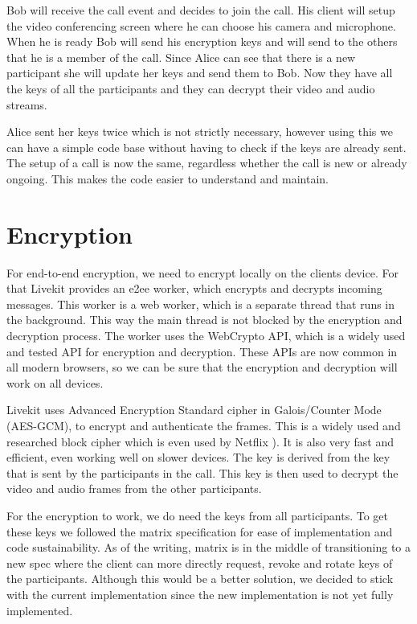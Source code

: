 \documentclass{report}
\begin{document}
Bob will receive the call event and decides to join the call. His client will setup the video conferencing
screen where he can choose his camera and microphone. When he is ready Bob will send his encryption keys and will
send to the others that he is a member of the call. Since Alice can see that there is a new participant she will
update her keys and send them to Bob. Now they have all the keys of all the participants and they can decrypt their
video and audio streams.

Alice sent her keys twice which is not strictly necessary, however using this we can have a simple code base
without having to check if the keys are already sent. The setup of a call is now the same, regardless whether
the call is new or already ongoing. This makes the code easier to understand and maintain.

\section{Encryption}
For end-to-end encryption, we need to encrypt locally on the clients device. For that Livekit provides an e2ee worker,
which encrypts and decrypts incoming messages. This worker is a web worker, which is a separate
thread that runs in the background. This way the main thread is not blocked by the encryption and decryption
process. The worker uses the WebCrypto API, which is a widely used and tested API for encryption and decryption.
These APIs are now common in all modern browsers, so we can be sure that the encryption and decryption will work on
all devices.

Livekit uses Advanced Encryption Standard cipher in Galois/Counter Mode (AES-GCM), to encrypt and authenticate the
frames. This is a widely used and researched block cipher which is even used by Netflix
). It is also very fast and efficient, even working well on slower devices. The key is derived from the key that is
sent by the participants in the call. This key is then used to decrypt the video and audio frames from the other
participants.


For the encryption to work, we do need the keys from all participants. To get these keys we followed the matrix
specification for ease of implementation and code sustainability. As of the writing, matrix is in the middle of
transitioning to a new spec where the client can more directly request, revoke and rotate keys of the participants.
Although this would be a better solution, we decided to stick with the current implementation since the new
implementation is not yet fully implemented.
\end{document}
